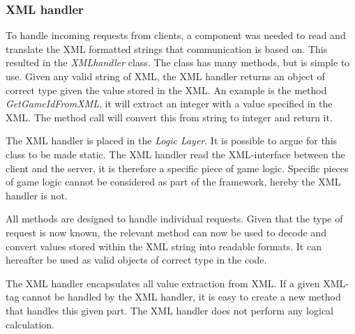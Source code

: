 \subsubsection{XML handler}
\label{sec:xmlhandlerimpl}
To handle incoming requests from clients, a component was needed to read and translate the XML formatted strings that communication is based on. This resulted in the \textit{XMLhandler} class. The class has many methods, but is simple to use. Given any valid string of XML, the XML handler returns an object of correct type given the value stored in the XML. An example is the method \textit{GetGameIdFromXML}, it will extract an integer with a value specified in the XML. The method call will convert this from string to integer and return it. 

The XML handler is placed in the \textit{Logic Layer}. It is possible to argue for this class to be made static. The XML handler read the XML-interface between the client and the server, it is therefore a specific piece of game logic.  Specific pieces of game logic cannot be considered as part of the framework, hereby the XML handler is not.

All methods are designed to handle individual requests. Given that the type of request is now known, the relevant method can now be used to decode and convert values stored within the XML string into readable formats. It can hereafter be used as valid objects of correct type in the code.

The XML handler encapsulates all value extraction from XML. If a given XML-tag cannot be handled by the XML handler, it is easy to create a new method that handles this given part. The XML handler does not perform any logical calculation.